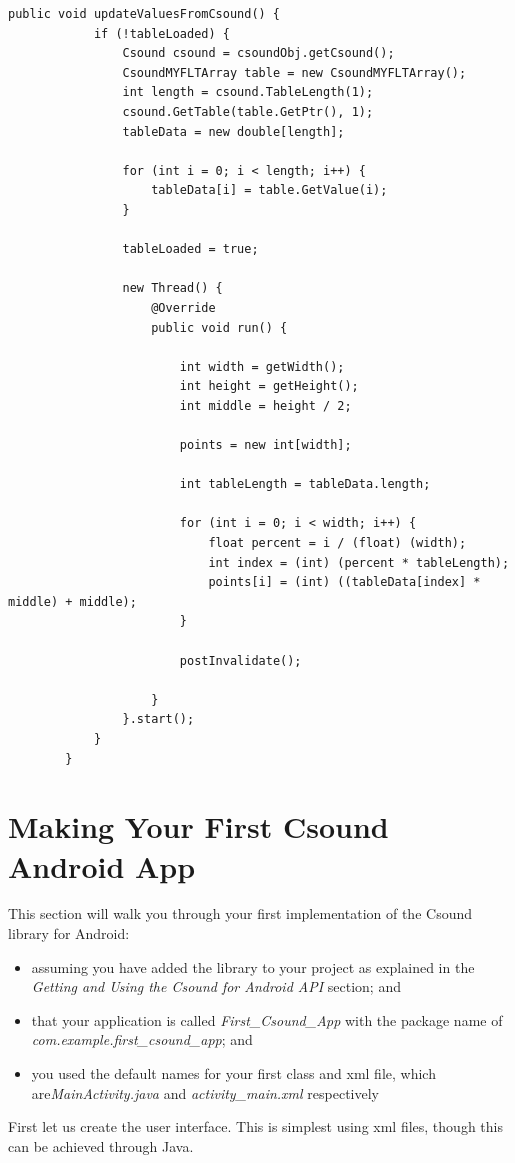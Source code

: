 \documentclass[11pt]{article}
\begin{document}
\begin{lstlisting}[caption=Waveview code demonstrating reading f-tables from Csound]
		public void updateValuesFromCsound() {
			if (!tableLoaded) {
				Csound csound = csoundObj.getCsound();
				CsoundMYFLTArray table = new CsoundMYFLTArray();
				int length = csound.TableLength(1);
				csound.GetTable(table.GetPtr(), 1);
				tableData = new double[length];

				for (int i = 0; i < length; i++) {
					tableData[i] = table.GetValue(i);
				}

				tableLoaded = true;

				new Thread() {
					@Override
					public void run() {

						int width = getWidth();
						int height = getHeight();
						int middle = height / 2;

						points = new int[width];

						int tableLength = tableData.length;

						for (int i = 0; i < width; i++) {
							float percent = i / (float) (width);
							int index = (int) (percent * tableLength);
							points[i] = (int) ((tableData[index] * middle) + middle);
						}

						postInvalidate();

					}
				}.start();
			}
		}
\end{lstlisting}



\section{Making Your First Csound Android App }
This section will walk you through your first implementation of the Csound library for Android: 
\begin{itemize}
\item assuming you have added the library to your project as explained in the \textit{Getting and Using the Csound for Android API} section; and
\item  that your application is called \textit{First_Csound_App} with the package name of \textit{com.example.first_csound_app}; and
\item you used the default names for your first class and xml file, which are\textit{MainActivity.java}  and  \textit{activity_main.xml}  respectively
\end{itemize}

 First let us create the user interface. This is simplest using xml files, though this can be achieved through Java.
\end{document}
